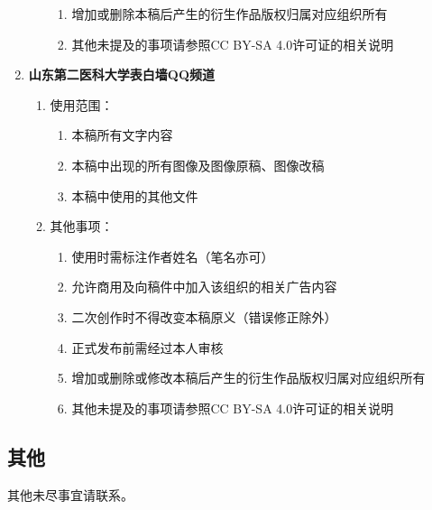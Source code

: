 \begin{enumerate}
\begin{enumerate}
\begin{enumerate}
                        \item 增加或删除本稿后产生的衍生作品版权归属对应组织所有
                        \item 其他未提及的事项请参照CC BY-SA 4.0许可证的相关说明
                    \end{enumerate}
          \end{enumerate}
    \item \textbf{山东第二医科大学表白墙QQ频道}
          \begin{enumerate}
              \item 使用范围：
                    \begin{enumerate}
                        \item 本稿所有文字内容
                        \item 本稿中出现的所有图像及图像原稿、图像改稿
                        \item 本稿中使用的其他文件
                    \end{enumerate}
              \item 其他事项：
                    \begin{enumerate}
                        \item 使用时需标注作者姓名（笔名亦可）
                        \item 允许商用及向稿件中加入该组织的相关广告内容
                        \item 二次创作时不得改变本稿原义（错误修正除外）
                        \item 正式发布前需经过本人审核
                        \item 增加或删除或修改本稿后产生的衍生作品版权归属对应组织所有
                        \item 其他未提及的事项请参照CC BY-SA 4.0许可证的相关说明
                    \end{enumerate}
          \end{enumerate}
\end{enumerate}

\subsection[其他]{其他}
其他未尽事宜请联系。
